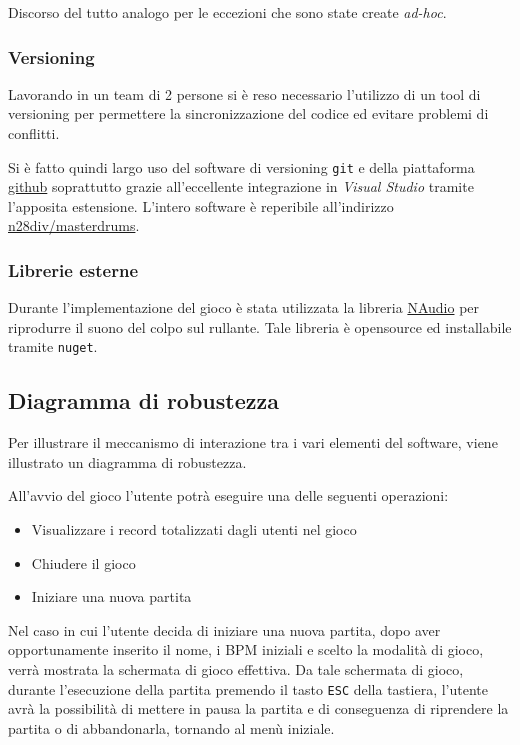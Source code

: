 Discorso del tutto analogo per le eccezioni che sono state create \emph{ad-hoc}.

\subsubsection{Versioning}
Lavorando in un team di 2 persone si è reso necessario l'utilizzo di un tool di versioning per permettere la sincronizzazione del codice ed evitare problemi di conflitti.

Si è fatto quindi largo uso del software di versioning \texttt{git} e della piattaforma \hyperlink{https://github.com}{github} soprattutto grazie all'eccellente integrazione in \emph{Visual Studio} tramite l'apposita estensione.
L'intero software è reperibile all'indirizzo \hyperlink{https://github.com/n28div/masterdrums}{n28div/masterdrums}.

\subsubsection{Librerie esterne}
Durante l'implementazione del gioco è stata utilizzata la libreria \hyperlink{https://github.com/naudio/NAudio}{NAudio} per riprodurre il suono del colpo sul rullante.
Tale libreria è opensource ed installabile tramite \texttt{nuget}.
\newpage
\subsection{Diagramma di robustezza}
Per illustrare il meccanismo di interazione tra i vari elementi del software, viene illustrato un diagramma di robustezza.

\vspace{1cm}
\begin{figure}[h]
\end{figure}
\vspace{1.5cm}
All'avvio del gioco l'utente potrà eseguire una delle seguenti operazioni:
\begin{itemize}
    \item Visualizzare i record totalizzati dagli utenti nel gioco
    \item Chiudere il gioco
    \item Iniziare una nuova partita
\end{itemize}
\vspace{1cm}
Nel caso in cui l'utente decida di iniziare una nuova partita, dopo aver opportunamente inserito il nome, i BPM iniziali e scelto la modalità di gioco, verrà mostrata la schermata di gioco effettiva. Da tale schermata di gioco, durante l'esecuzione della partita premendo il tasto \texttt{ESC} della tastiera, l'utente avrà la possibilità di mettere in pausa la partita e di conseguenza di riprendere la partita o di abbandonarla, tornando al menù iniziale.

